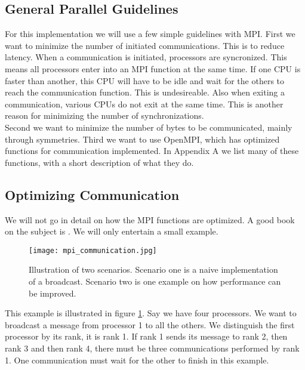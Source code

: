 \documentclass[a4paper,norsk,11pt,twoside]{report}
\begin{document}
\subsection{General Parallel Guidelines}
For this implementation we will use a few simple guidelines with
MPI. First we want to minimize the number of initiated
communications. This is to reduce latency. When a communication is
initiated, processors are syncronized. This means all processors enter
into an MPI function at the same time. If one CPU is faster than
another, this CPU will have to be idle and wait for the others to
reach the communication function. This is undesireable. Also when
exiting a communication, various CPUs do not exit at the same time. This is
another reason for minimizing the number of synchronizations. \\

Second we want to minimize the number of bytes to be communicated,
mainly through symmetries. Third we want to use OpenMPI, which has
optimized functions for communication implemented. In Appendix A we
list many of these functions, with a short description of what they
do.

\subsection{Optimizing Communication}

We will not go in detail on how the MPI functions are optimized. A
good book on the subject is \cite{mpi_boka_cite_referanse}. We will
only entertain a small example. \\

\begin{figure}[ht!]
\centering
\texttt{[image: mpi\_communication.jpg]}
\caption{Illustration of two scenarios. Scenario one is a naive implementation of a broadcast. Scenario two is one example on how performance can be improved.}
\label{mpi_communication_illustration_thingy}
\end{figure}

This example is illustrated in figure
\ref{mpi_communication_illustration_thingy}. Say we have four
processors. We want to broadcast a message from processor 1 to all the
others. We distinguish the first processor by its rank, it is rank
1. If rank 1 sends its message to rank 2, then rank 3 and then rank 4,
there must be three communications performed by rank 1. One
communication must wait for the other to finish in this example. \\
\end{document}
